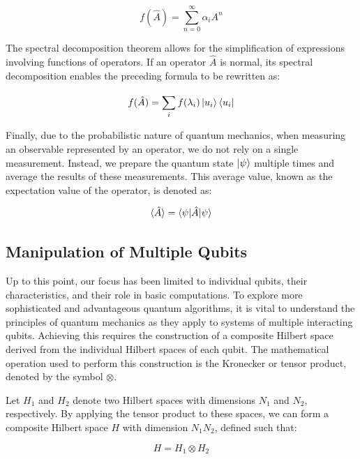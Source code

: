 \documentclass[en]{dimscthesis}
\begin{document}
\begin{equation}
	f(\hat{A}) = \sum_{n=0}^{\infty} \alpha_i A^n
	\label{eq:infinite_sum}
\end{equation}

The spectral decomposition theorem allows for the simplification of expressions involving functions of operators. If an operator $\hat{A}$ is normal, its spectral decomposition enables the preceding formula to be rewritten as:

\begin{equation}
	f(\hat{A}) = \sum_{i}^{} f(\lambda_i) \ket{u_i}\bra{u_i}
	\label{eq:normal_theorem}
\end{equation}

Finally, due to the probabilistic nature of quantum mechanics, when measuring an observable represented by an operator, we do not rely on a single measurement. Instead, we prepare the quantum state $\ket{\psi}$ multiple times and average the results of these measurements. This average value, known as the expectation value of the operator, is denoted as:

\begin{equation}
	\braket{\hat{A}} = \braket{\psi|\hat{A}|\psi}
	\label{eq:expectation_value}
\end{equation}

\subsection{Manipulation of Multiple Qubits} \label{mult_qubit}

Up to this point, our focus has been limited to individual qubits, their characteristics, and their role in basic computations. To explore more sophisticated and advantageous quantum algorithms, it is vital to understand the principles of quantum mechanics as they apply to systems of multiple interacting qubits. Achieving this requires the construction of a composite Hilbert space derived from the individual Hilbert spaces of each qubit. The mathematical operation used to perform this construction is the Kronecker or tensor product, denoted by the symbol $\otimes$.

Let $H_1$ and $H_2$ denote two Hilbert spaces with dimensions $N_1$ and $N_2$, respectively. By applying the tensor product to these spaces, we can form a composite Hilbert space $H$ with dimension $N_1N_2$, defined such that:

\begin{equation}
	H = H_1 \otimes H_2
	\label{eq:tensor}
\end{equation}
\end{document}
